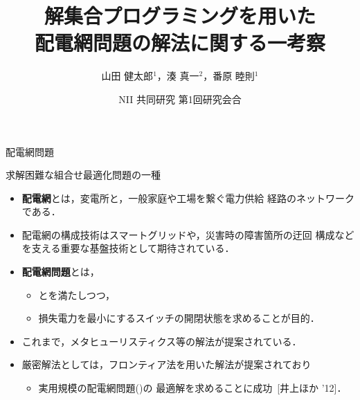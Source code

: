 \documentclass[dvipdfmx,11pt]{beamer}
\title{解集合プログラミングを用いた\\配電網問題の解法に関する一考察}
\author[山田 健太郎，湊 真一，番原 睦則]{山田 健太郎$^1$，湊 真一$^2$，番原 睦則$^1$}
\date{NII 共同研究 第1回研究会合}
\institute{1.名古屋大学 大学院情報学研究科 \\ 2.京都大学 大学院情報学研究科}
\begin{document}
\begin{frame}{}
  \titlepage
\end{frame}

\begin{frame}{配電網問題}
  \begin{alertblock}{}\centering
    求解困難な組合せ最適化問題の一種
  \end{alertblock}
  \vfill
  \begin{itemize}
  \item \alert{\bf 配電網}とは，変電所と，一般家庭や工場を繋ぐ電力供給
    経路のネットワークである．
  \item  配電網の構成技術はスマートグリッドや，災害時の障害箇所の迂回
    構成などを支える重要な基盤技術として期待されている．
  \item \alert{\bf 配電網問題}とは，
    \begin{itemize}
    \item {}とを満たしつつ，
    \item 損失電力を最小にするスイッチの開閉状態を求めることが目的．
    \end{itemize}
  \item これまで，メタヒューリスティクス等の解法が提案されている．
  \item 厳密解法としては，フロンティア法を用いた解法が提案されており
    \begin{itemize}
    \item 実用規模の配電網問題()の
      最適解を求めることに成功~[井上ほか '12]．
    \end{itemize}
  \end{itemize}
\end{frame}
\end{document}
